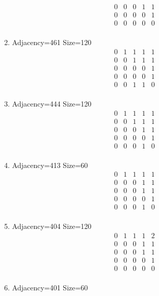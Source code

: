 \documentclass[12pt]{article}
\begin{document}
\begin{multicols}{3}
\begin{enumerate}
\begin{equation*}
\begin{array}{ccccc}
0&0&0&1&1\\
0&0&0&0&1\\
0&0&0&0&0\\
\end{array}
\end{equation*}
\item Adjacency=461 Size=120
\begin{equation*}
\begin{array}{ccccc}
0&1&1&1&1\\
0&0&1&1&1\\
0&0&0&0&1\\
0&0&0&0&1\\
0&0&1&1&0\\
\end{array}
\end{equation*}
\item Adjacency=444 Size=120
\begin{equation*}
\begin{array}{ccccc}
0&1&1&1&1\\
0&0&1&1&1\\
0&0&0&1&1\\
0&0&0&0&1\\
0&0&0&1&0\\
\end{array}
\end{equation*}
\item Adjacency=413 Size=60
\begin{equation*}
\begin{array}{ccccc}
0&1&1&1&1\\
0&0&0&1&1\\
0&0&0&1&1\\
0&0&0&0&1\\
0&0&0&1&0\\
\end{array}
\end{equation*}
\item Adjacency=404 Size=120
\begin{equation*}
\begin{array}{ccccc}
0&1&1&1&2\\
0&0&0&1&1\\
0&0&0&1&1\\
0&0&0&0&1\\
0&0&0&0&0\\
\end{array}
\end{equation*}
\item Adjacency=401 Size=60
\begin{equation*}

\end{equation*}
\end{enumerate}
\end{multicols}
\end{document}
